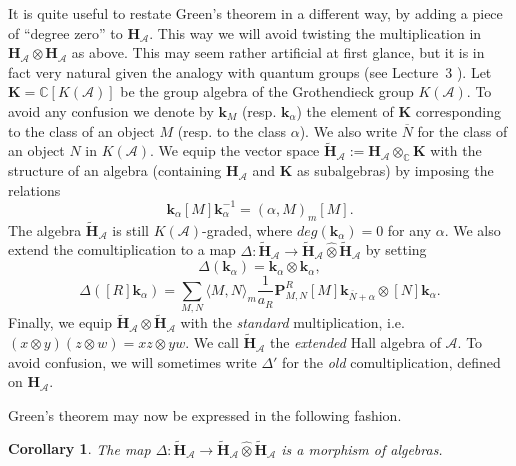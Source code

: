 \documentclass[a4paper,10pt]{amsart}
\def\H{\mathbf{H}}
\def\a{\alpha}
\def\C{\mathbb{C}}
\def\A{\mathcal{A}}
\newtheorem{cor}[theo]{Corollary}
\numberwithin{equation}{section}
\begin{document}
It is quite useful to restate Green's theorem in a different way, by adding a piece of ``degree zero'' to $\H_{\A}$. This way we will avoid twisting the multiplication in $\H_{\A} \otimes \H_{\A}$ as above.
 This may seem rather artificial at first glance, but it is in fact very natural given the analogy with quantum groups (see Lecture~3 ). Let $\mathbf{K}=\C[K(\A)]$ be the group algebra of the Grothendieck group $K(\A)$. To avoid any confusion we denote by $\mathbf{k}_{{M}}$ (resp. $\mathbf{k}_{\a}$) the element of $\mathbf{K}$ corresponding to the class of an object $M$ (resp. to the class $\a$). We also write $\overline{N}$ for the class of an object $N$ in $K(\A)$. We equip the vector space $\widetilde{\H}_{\A} := \H_{\A} \otimes_{\C} \mathbf{K}$ with the structure of an algebra (containing $\H_{\A}$ and $\mathbf{K}$ as subalgebras) by imposing the relations
$$\mathbf{k}_{\a} [M] \mathbf{k}_{\a}^{-1}=(\a, M )_m[M].$$
The algebra $\widetilde{\H}_{\A}$ is still $K(\A)$-graded, where $deg(\mathbf{k}_{\a})=0$ for any $\a$.
We also extend the comultiplication to a map ${\Delta}: \widetilde{\H}_{\A} \to \widetilde{\H}_{\A} \widehat{\otimes} \widetilde{\H}_{\A}$ by setting
\begin{equation}\label{E:hallcoprodext1}
{\Delta}(\mathbf{k}_{\a})=\mathbf{k}_{\a} \otimes \mathbf{k}_{\a},
\end{equation}
\begin{equation}\label{E:hallcoprodext2}
{\Delta}([R]\mathbf{k}_{\a})=\sum_{M,N} \langle M, N \rangle_m \frac{1}{a_R} \mathbf{P}^R_{M,N} [M]\mathbf{k}_{\overline{N}+\a} \otimes [N]\mathbf{k}_{\a}.
\end{equation}
Finally, we equip $\widetilde{\H}_{\A} \otimes \widetilde{\H}_{\A}$ with the \textit{standard} multiplication, i.e. $(x \otimes y) (z \otimes w)=xz \otimes yw$. We call $\widetilde{\H}_{\A}$ the \textit{extended} Hall algebra of $\A$. To avoid confusion, we will sometimes write $\Delta'$ for the \textit{old} comultiplication, defined on $\H_{\A}$.

\vspace{.1in}

Green's theorem may now be expressed in the following fashion.

\begin{cor} The map ${\Delta}: \widetilde{\H}_{\A} \to \widetilde{\H}_{\A} \widehat{\otimes} \widetilde{\H}_{\A}$ is a morphism of algebras.\end{cor}

\vspace{.1in}
\end{document}

